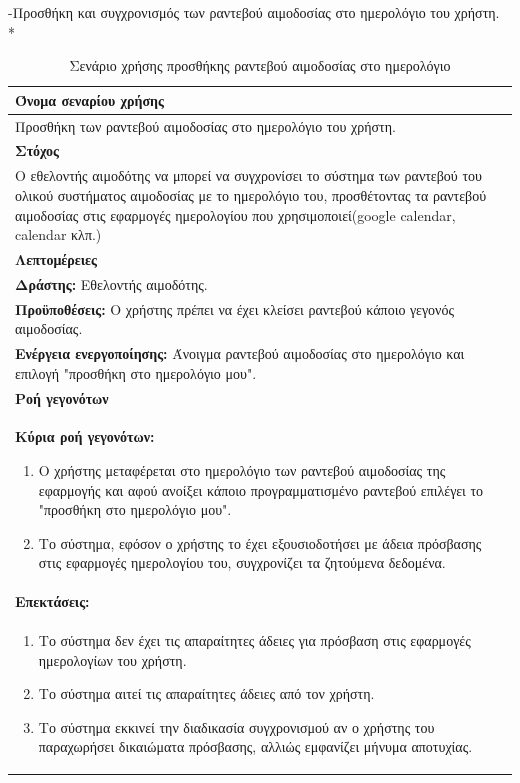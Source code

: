 -Προσθήκη και συγχρονισμός των ραντεβού αιμοδοσίας στο ημερολόγιο του χρήστη.
\\*
\begin{table}[H]
	\begin{center}
	    \begin{tabular}{|p{\dimexpr \linewidth-2\tabcolsep}|}
	    \hline
	    \rowcolor{grayy}
	    \textbf{Όνομα σεναρίου χρήσης}
	    \\ \hline    
	    Προσθήκη των ραντεβού αιμοδοσίας στο ημερολόγιο του χρήστη.
	     \\ \hline
	    \rowcolor{grayy}
	    \textbf{\textbf{Στόχος}}
	    \\ \hline
	 	 Ο εθελοντής αιμοδότης να μπορεί να συγχρονίσει το σύστημα των ραντεβού του ολικού συστήματος αιμοδοσίας με το ημερολόγιο του, προσθέτοντας τα  ραντεβού αιμοδοσίας στις εφαρμογές ημερολογίου που χρησιμοποιεί(google calendar, calendar κλπ.)
	    \\ \hline
	    \rowcolor{grayy}
	    \textbf{Λεπτομέρειες}
	    \\ \hline
		\textbf{Δράστης:} Εθελοντής αιμοδότης.
		\\*
		\textbf{Προϋποθέσεις:} Ο χρήστης πρέπει να έχει κλείσει ραντεβού κάποιο γεγονός αιμοδοσίας.
		\\*
		\textbf{Ενέργεια ενεργοποίησης:} Άνοιγμα ραντεβού αιμοδοσίας  στο ημερολόγιο και επιλογή "προσθήκη στο ημερολόγιο μου".
	    \\ \hline
		\rowcolor{grayy}    
	    \textbf{Ροή γεγονότων}
	    \\ \hline
		\textbf{Κύρια ροή γεγονότων:}
		\begin{enumerate}
		\item	 Ο χρήστης μεταφέρεται στο ημερολόγιο των ραντεβού αιμοδοσίας της εφαρμογής και αφού ανοίξει κάποιο προγραμματισμένο ραντεβού επιλέγει το "προσθήκη στο ημερολόγιο μου".
		\item  Το σύστημα, εφόσον ο χρήστης το έχει εξουσιοδοτήσει με άδεια πρόσβασης στις εφαρμογές ημερολογίου του, συγχρονίζει τα ζητούμενα δεδομένα.
		\end{enumerate}
		\\ \hline
		\textbf{Επεκτάσεις:}
		   \\ \hline
		\begin{enumerate}
			\item Το σύστημα δεν έχει τις απαραίτητες άδειες για πρόσβαση στις εφαρμογές ημερολογίων του χρήστη.
			\item Το σύστημα αιτεί τις απαραίτητες άδειες από τον χρήστη.
			\item Το σύστημα εκκινεί την διαδικασία συγχρονισμού αν ο χρήστης του παραχωρήσει δικαιώματα πρόσβασης, αλλιώς εμφανίζει μήνυμα αποτυχίας.
		\end{enumerate}
		\\ \hline
	    \end{tabular}
	    \caption{Σενάριο χρήσης προσθήκης ραντεβού αιμοδοσίας στο ημερολόγιο}
	    \label{tab:add_blood_donation_to_calendar}
	\end{center}
\end{table}	
		
